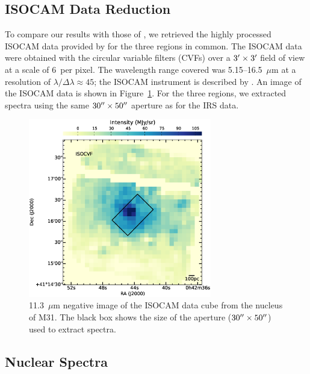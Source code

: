 \subsection{ISOCAM Data Reduction}
\label{sect:iso_data}

To compare our results with those of  \citet{1998Cesarsky}, we retrieved the highly processed ISOCAM data provided by \citet{Boulanger_F_2005}  
for the three regions in common. 
The ISOCAM data were obtained with the circular variable filters (CVFs) over a $3\hbox{$^\prime$} \times 3\hbox{$^\prime$}$ field of view at a scale of 6\arcsec\ per pixel. 
The wavelength range covered was 5.15--16.5~$\mu$m at a resolution of $\lambda/\Delta \lambda \approx 45$; the ISOCAM instrument is described by \citet{cesarsky1996}.
An image of the ISOCAM data is shown in Figure~\ref{isonuc}.  For the three regions, we extracted spectra using the same 
$30\hbox{$^{\prime\prime}$}\times50\hbox{$^{\prime\prime}$}$ aperture as for the IRS data. 

\begin{figure}
\centering
\includegraphics[width = 8cm]{./isonuc.eps}
\caption{11.3~$\mu$m negative image of the ISOCAM data cube from the nucleus of M31. 
The black box shows the size of the aperture ($30\hbox{$^{\prime\prime}$}\times50\hbox{$^{\prime\prime}$}$) used to extract spectra.}
\label{isonuc}
\end{figure}

\subsection{Nuclear Spectra}
\label{obs:nuc}

